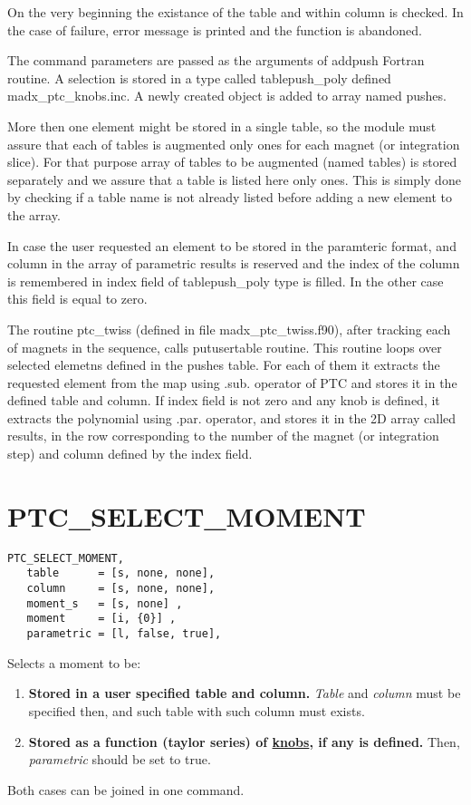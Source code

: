 On the very beginning the existance of the table and within column is
checked. In the case of failure, error message is printed and the
function is abandoned.   

The command parameters are passed as the arguments of addpush Fortran
routine.  A selection is stored in a type called tablepush\_poly defined
madx\_ptc\_knobs.inc. A newly created object is added to array named
pushes.    

More then one element might be stored in a single table, so the module
must assure that  each of tables is augmented only ones for each magnet
(or integration slice).  For that purpose array of tables to be
augmented (named tables) is stored separately and  we assure that a
table is listed here only ones. This is simply done by checking  if a
table name is not already listed before adding a new element to the
array.   

In case the user requested an element to be stored in the paramteric
format, and column in the array of parametric results is reserved and
the index of the column is remembered in index field of tablepush\_poly
type is filled. In the other case this field is equal to zero.   

The routine ptc\_twiss (defined in file madx\_ptc\_twiss.f90), after
tracking each of magnets  in the sequence, calls putusertable
routine. This routine loops over selected elemetns defined in the pushes
table. For each of them it extracts the requested element from the map
using .sub.  operator of PTC and stores it in the defined table and
column.  If index field is not zero and any knob is defined, it extracts
the polynomial using .par. operator, and stores it in the 2D array
called results, in the row corresponding to the number of the magnet (or
integration step) and column defined by the index field.     



%
\section{PTC\_SELECT\_MOMENT}

\begin{verbatim}
PTC_SELECT_MOMENT, 
   table      = [s, none, none], 
   column     = [s, none, none], 
   moment_s   = [s, none] , 
   moment     = [i, {0}] , 
   parametric = [l, false, true], 
\end{verbatim}

Selects a moment to be: 
\begin{enumerate}
  \item {\bf Stored in a user specified table and column.}
    \textit{Table} and \textit{column} must be specified then, and such
    table with such column must exists.  

  \item {\bf Stored as a function (taylor series) of
    \href{PTC_Knob.html}{knobs}, if any is defined.} Then,
    \textit{parametric} should be set to true. 
\end{enumerate}
Both cases can be joined in one command.   


